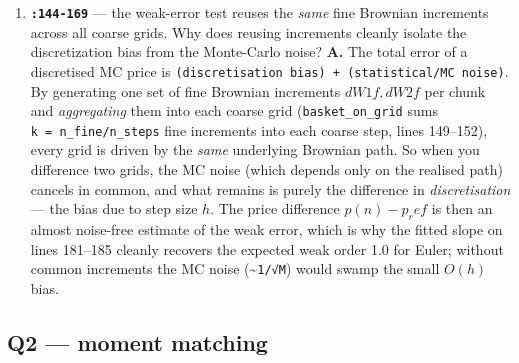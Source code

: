 \documentclass[
  11pt,
]{article}
\begin{document}
\begin{enumerate}
{  observed)}
\item
  \textbf{\texttt{:144-169}} --- the weak-error test reuses the
  \emph{same} fine Brownian increments across all coarse grids. Why does
  reusing increments cleanly isolate the discretization bias from the
  Monte-Carlo noise? \textbf{A.} The total error of a discretised MC
  price is \texttt{(discretisation\ bias)\ +\ (statistical/MC\ noise)}.
  By generating one set of fine Brownian increments \(dW1f, dW2f\) per
  chunk and \emph{aggregating} them into each coarse grid
  (\texttt{basket\_on\_grid} sums \texttt{k\ =\ n\_fine/n\_steps} fine
  increments into each coarse step, lines 149--152), every grid is
  driven by the \emph{same} underlying Brownian path. So when you
  difference two grids, the MC noise (which depends only on the realised
  path) cancels in common, and what remains is purely the difference in
  \emph{discretisation} --- the bias due to step size \(h\). The price
  difference \(p(n) − p_ref\) is then an almost noise-free estimate of
  the weak error, which is why the fitted slope on lines 181--185
  cleanly recovers the expected weak order 1.0 for Euler; without common
  increments the MC noise (\textasciitilde{}\texttt{1/√M}) would swamp
  the small \(O(h)\) bias.
\end{enumerate}

\hypertarget{q2-moment-matching}{%
\subsection{Q2 --- moment matching}\label{q2-moment-matching}}
\end{document}
